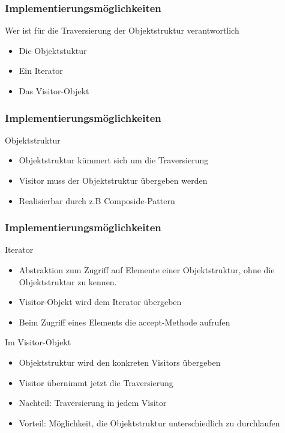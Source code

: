 \begin{frame}
	\frametitle{Implementierungsmöglichkeiten}
  \begin{block}{Wer ist für die Traversierung der Objektstruktur verantwortlich}
  	\begin{itemize}
  		\item Die Objektstuktur
  		\item Ein Iterator
  		\item Das Visitor-Objekt
  	\end{itemize}
  \end{block}
\end{frame}


\begin{frame}
	\frametitle{Implementierungsmöglichkeiten}
  \begin{block}{Objektstruktur}
  	\begin{itemize}
  		\item Objektstruktur kümmert sich um die Traversierung 
  		\item Visitor muss der Objektstruktur übergeben werden
  		\item Realisierbar durch z.B Composide-Pattern
  	\end{itemize}
  \end{block}
\end{frame}

\begin{frame}
	\frametitle{Implementierungsmöglichkeiten}
  \begin{block}{Iterator}
  	\begin{itemize}
  		\item Abstraktion zum Zugriff auf Elemente einer Objektstruktur, ohne die  Objektstruktur zu kennen.
  		\item Visitor-Objekt wird dem Iterator übergeben
  		\item Beim Zugriff eines Elements die accept-Methode aufrufen

  	\end{itemize}
  \end{block}
	\begin{block}{Im Visitor-Objekt}
  	\begin{itemize}
  		\item Objektstruktur wird den konkreten Visitors übergeben
  		\item Visitor übernimmt jetzt die Traversierung
  		\item Nachteil: Traversierung in jedem Visitor
  		\item Vorteil: Möglichkeit, die Objektstruktur unterschiedlich zu durchlaufen
  	\end{itemize}
  \end{block}
\end{frame}


